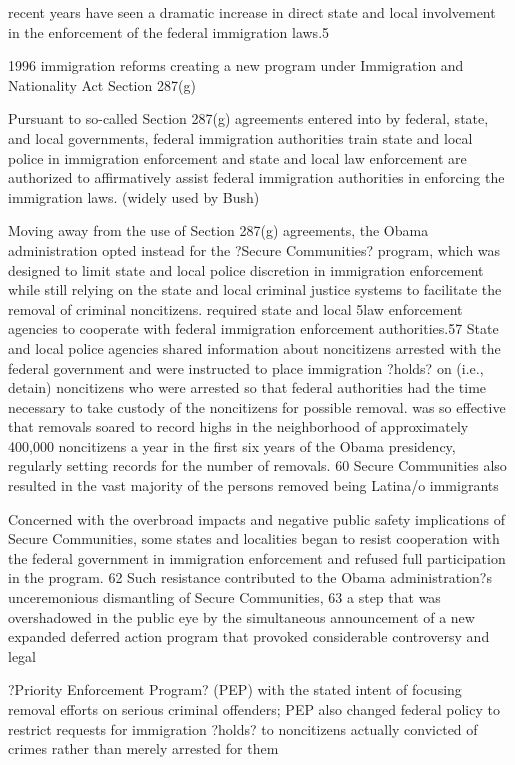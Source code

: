 \documentclass[xcolor=pdftex,dvipsnames,table]{beamer}
\begin{document}
recent years have seen a dramatic increase in
direct state and local involvement in the enforcement of the federal immigration laws.5

 1996 immigration reforms creating
a new program under Immigration and Nationality Act Section 287(g)

Pursuant to so-called
Section 287(g) agreements entered into by federal, state, and local governments, federal
immigration authorities train state and local police in immigration enforcement and state and
local law enforcement are authorized to affirmatively assist federal immigration authorities in
enforcing the immigration laws. (widely used by Bush)

Moving away from the use of Section 287(g) agreements, the Obama administration
opted instead for the ?Secure Communities? program, which was designed to limit state and
local police discretion in immigration enforcement while still relying on the state and local
criminal justice systems to facilitate the removal of criminal noncitizens. required state and local 
5law enforcement agencies to cooperate with federal immigration enforcement authorities.57 State
and local police agencies shared information about noncitizens arrested with the federal
government and were instructed to place immigration ?holds? on (i.e., detain) noncitizens who
were arrested so that federal authorities had the time necessary to take custody of the noncitizens
for possible removal. was so effective that removals soared to record highs in the neighborhood of approximately
400,000 noncitizens a year in the first six years of the Obama presidency, regularly setting
records for the number of removals.
60 Secure Communities also resulted in the vast majority of
the persons removed being Latina/o immigrants

Concerned with the overbroad impacts and negative public safety implications of Secure
Communities, some states and localities began to resist cooperation with the federal government
in immigration enforcement and refused full participation in the program.
62 Such resistance
contributed to the Obama administration?s unceremonious dismantling of Secure Communities,
63
a step that was overshadowed in the public eye by the simultaneous announcement of a new
expanded deferred action program that provoked considerable controversy and legal 

?Priority Enforcement Program? (PEP) with the stated intent of
focusing removal efforts on serious criminal offenders; PEP also changed federal policy to
restrict requests for immigration ?holds? to noncitizens actually convicted of crimes rather than
merely arrested for them
\end{document}
